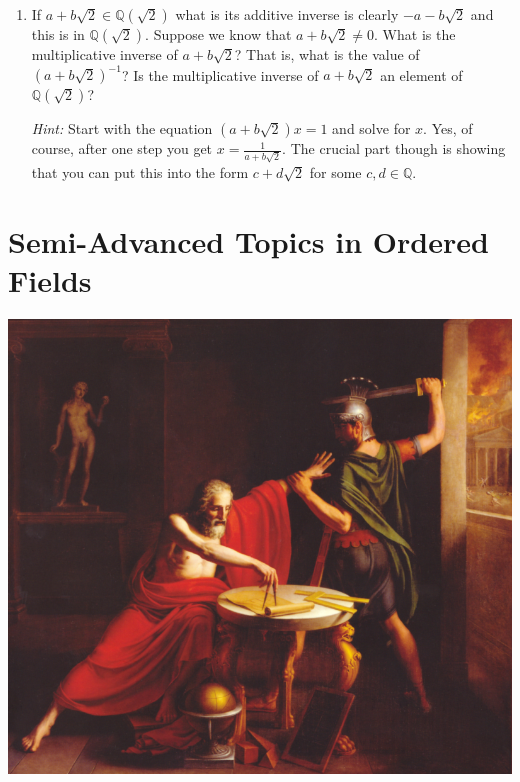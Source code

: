 \documentclass[11pt]{article}
\theoremstyle{definition}
\begin{document}
\begin{enumerate}
      \vspace{1in}

    \item If $a+b\sqrt{2}\in \mathbb{Q}(\sqrt{2})$ what is its additive inverse is clearly $-a-b\sqrt{2}$ and this is in $\mathbb{Q}(\sqrt{2})$. Suppose
      we know that $a+b\sqrt{2} \neq 0$. What is the multiplicative inverse of $a+b\sqrt{2}$? That is, what is the value of $(a+b\sqrt{2})^{-1}$? Is
      the multiplicative inverse of $a+b\sqrt{2}$ an element of $\mathbb{Q}(\sqrt{2})$?

      \textit{Hint:} Start with the equation $(a+b\sqrt{2})x = 1$ and solve for $x$. Yes, of course, after one step you get $x=\frac{1}{a+b\sqrt{2}}$. The
      crucial part though is showing that you can put this into the form $c+d\sqrt{2}$ for some $c,d\in\mathbb{Q}$.

      \vspace{1in}
  \end{enumerate}\newpage

\part{Semi-Advanced Topics in Ordered Fields}

\begin{center}
  \includegraphics{Images/Death_of_Archimedes.png}
\end{center}
\end{document}
